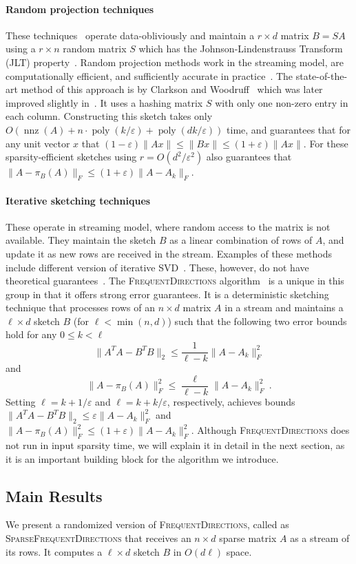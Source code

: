 \documentclass[11pt]{article}
\newcommand{\nnz}{\operatorname{nnz}}
\newcommand{\poly}{\operatorname{poly}}
\newcommand{\eps}{\varepsilon}
\newcommand{\fd}{\textsc{FrequentDirections}\xspace}
\newcommand{\sfd}{\textsc{SparseFrequentDirections}\xspace}
\newcommand{\Paragraph}[1]{\paragraph*{\sffamily \textbf{#1}}}
\begin{document}
\Paragraph{Random projection techniques} 
These techniques~\cite{papadimitriou1998latent,vempala2004random,sarlos2006improved,liberty2007randomized} operate data-obliviously and maintain a $r \times d$ matrix $B = S A$ using a $r \times n$ random matrix $S$ which has the Johnson-Lindenstrauss Transform (JLT) property~\cite{matouvsek2008variants}.  
Random projection methods work in the streaming model, are computationally efficient, and sufficiently accurate in practice~\cite{desai2015improved}.
The state-of-the-art method of this approach is by Clarkson and Woodruff~\cite{clarkson2013low} which was later improved slightly in~\cite{NN13}. 
It uses a hashing matrix $S$ with only one non-zero entry in each column.  Constructing this sketch takes only  $O(\nnz(A) + n \cdot \poly(k/\eps) + \poly(dk/\eps))$ time, and guarantees that for any unit vector $x$ that 
$
(1-\eps)\|Ax\| \leq \|B x\| \leq (1+\eps) \|Ax\|.
$
For these sparsity-efficient sketches using $r = O(d^2/\eps^2)$ also guarantees that 
$\|A - \pi_B(A)\|_F \leq (1+\eps) \|A - A_k\|_F$.    


\Paragraph{Iterative sketching techniques} 
These operate in streaming model, where random access to the matrix is not available. 
They maintain the sketch $B$ as a linear combination of rows of $A$, and update it as new rows are received in the stream.  
Examples of these methods include different version of iterative SVD~\cite{golub2012matrix, hall1998incremental, levey2000sequential, brand2002incremental,ross2008incremental}. These, however, do not have theoretical guarantees~\cite{desai2015improved}.   
The \fd algorithm~\cite{liberty2013simple} is a unique in this group in that it offers strong error guarantees. 
It is a deterministic sketching technique that processes rows of an $n \times d$ matrix $A$ in a stream and maintains a $\ell \times d$ sketch $B$ (for $\ell < \min(n,d)$) such that the following two error bounds hold for any $0 \leq k < \ell$
\[
\|A^TA - B^TB\|_2 \leq \frac{1}{\ell-k}\|A-A_k\|_F^2
\]
and
\[
 \|A-\pi_B(A)\|_F^2 \leq \frac{\ell}{\ell-k} \|A-A_k\|_F^2 \ .
\]
Setting $\ell = k + 1/\eps$ and $\ell = k + k/\eps$, respectively, achieves bounds 
$
\|A^TA - B^TB\|_2 \leq \eps \|A-A_k\|_F^2
$
and
$
\|A-\pi_B(A)\|_F^2 \leq (1+\eps) \|A-A_k\|_F^2.
$
Although \fd does not run in input sparsity time, we will explain it in detail in the next section, as it is an important building block for the algorithm we introduce.  

\subsection{Main Results} 
We present a randomized version of \fd, called as \sfd that receives an $n \times d$ sparse matrix $A$ as a stream of its rows. 
It computes a $\ell \times d$ sketch $B$ in $O(d\ell)$ space. 
\end{document}
